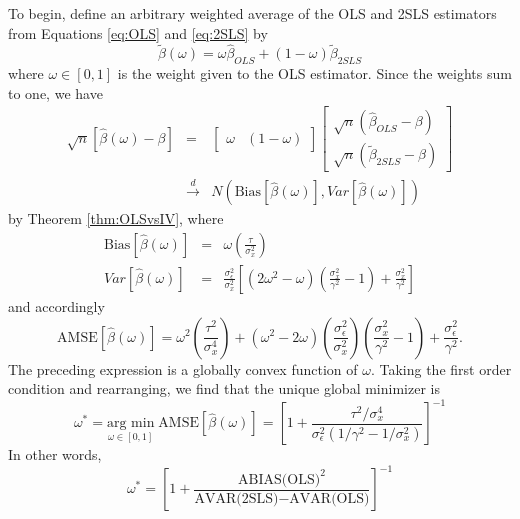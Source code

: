 To begin, define an arbitrary weighted average of the OLS and 2SLS estimators from Equations \ref{eq:OLS} and \ref{eq:2SLS} by  
\begin{equation}
	\widetilde{\beta}(\omega) = \omega \widehat{\beta}_{OLS} + (1 - \omega) \widetilde{\beta}_{2SLS}
\end{equation}
where $\omega \in [0,1]$ is the weight given to the OLS estimator.
Since the weights sum to one, we have
\begin{eqnarray*}
	\sqrt{n}\left[\widehat{\beta}(\omega) - \beta \right] &=& \left[ \begin{array}
	{cc} \omega & (1 - \omega)
\end{array}\right] \left[
\begin{array}{c}
  \sqrt{n}(\widehat{\beta}_{OLS} - \beta) \\
  \sqrt{n}(\widetilde{\beta}_{2SLS} - \beta)
\end{array}
\right]\\
& \overset{d}{\rightarrow} & N\left(\mbox{Bias}\left[\widehat{\beta}(\omega)\right], Var\left[\widehat{\beta}(\omega)\right] \right)
\end{eqnarray*}
by Theorem \ref{thm:OLSvsIV}, where
\begin{eqnarray*}
	\mbox{Bias}\left[\widehat{\beta}(\omega)\right] &=& \omega \left( \frac{\tau}{\sigma_x^2} \right) \\
	 Var\left[\widehat{\beta}(\omega)\right] &=&  \frac{\sigma_\epsilon^2}{\sigma_x^2} \left[(2\omega^2 - \omega)\left( \frac{\sigma_x^2}{\gamma^2} - 1\right)+\frac{\sigma_x^2}{\gamma^2} \right]
\end{eqnarray*}
and accordingly
\begin{equation}
	\mbox{AMSE}\left[\widehat{\beta}(\omega) \right] =  \omega^2 \left(\frac{\tau^2}{\sigma_x^4} \right) + (\omega^2 - 2 \omega)\left(\frac{\sigma_\epsilon^2}{\sigma_x^2}\right)\left( \frac{\sigma_x^2}{\gamma^2} - 1\right) + \frac{\sigma_\epsilon^2}{\gamma^2}.
\end{equation}
The preceding expression is a globally convex function of $\omega$. 
Taking the first order condition and rearranging, we find that the unique global minimizer is
\begin{equation}
\label{eq:AMSEoptimal}
	\omega^* = \underset{\omega \in [0,1]}{\mbox{arg min}}\; \mbox{AMSE}\left[\widehat{\beta}(\omega) \right] 
	=\left[1 + \frac{\tau^2/\sigma_x^4}{\sigma_\epsilon^2(1/\gamma^2 - 1/\sigma_x^2)}\right]^{-1}
\end{equation}
In other words,
$$\omega^* = \left[1 + \frac{\mbox{ABIAS(OLS)}^2}{\mbox{AVAR(2SLS)}-\mbox{AVAR(OLS)}} \right]^{-1}$$

